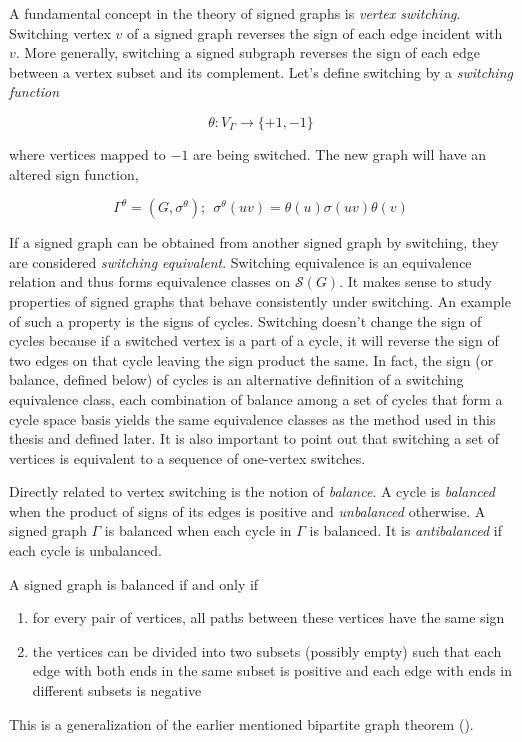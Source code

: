 A fundamental concept in the theory of signed graphs is \textit{vertex switching}. Switching vertex $v$ of a signed graph reverses the sign of each edge incident with $v$. More generally, switching a signed subgraph reverses the sign of each edge between a vertex subset and its complement. Let's define switching by a \textit{switching function}

$$\theta : V_{\Gamma} \rightarrow \{+1, -1\}$$

where vertices mapped to $-1$ are being switched. The new graph will have an altered sign function,

$$\Gamma ^{\theta} = (G, \sigma ^{\theta}); ~~ \sigma ^{\theta} (uv) = \theta (u) \sigma (uv) \theta (v)$$

If a signed graph can be obtained from another signed graph by switching, they are considered \textit{switching equivalent}. Switching equivalence is an equivalence relation and thus forms equivalence classes on $\mathcal{S} (G)$. It makes sense to study properties of signed graphs that behave consistently under switching. An example of such a property is the signs of cycles. Switching doesn't change the sign of cycles because if a switched vertex is a part of a cycle, it will reverse the sign of two edges on that cycle leaving the sign product the same. In fact, the sign (or balance, defined below) of cycles is an alternative definition of a switching equivalence class, each combination of balance among a set of cycles that form a cycle space basis yields the same equivalence classes as the method used in this thesis and defined later. It is also important to point out that switching a set of vertices is equivalent to a sequence of one-vertex switches.

Directly related to vertex switching is the notion of \textit{balance}. A cycle is \textit{balanced} when the product of signs of its edges is positive and \textit{unbalanced} otherwise. A signed graph $\Gamma$ is balanced when each cycle in $\Gamma$ is balanced. It is \textit{antibalanced} if each cycle is unbalanced.

\begin{theorem}[Harary]\label{th:harary}
    A signed graph is balanced if and only if
    \begin{enumerate}
        \item for every pair of vertices, all paths between these vertices have the same sign
        \item the vertices can be divided into two subsets (possibly empty) such that each edge with both ends in the same subset is positive and each edge with ends in different subsets is negative
    \end{enumerate}

    This is a generalization of the earlier mentioned bipartite graph theorem ().
\end{theorem}

